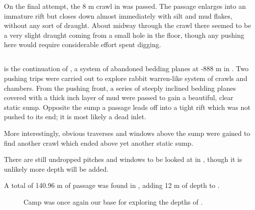 On the final attempt, the 8 m crawl in  was passed.
The passage enlarges into an immature rift but closes down almost
immediately with silt and mud flakes, without any sort of draught. About
midway through the crawl there seemed to be a very slight draught coming
from a small hole in the floor, though any pushing here would require
considerable effort spent digging.


\subsection{}

 is the continuation of , a
system of abandoned bedding planes at -888 m in . Two
pushing trips were carried out to explore rabbit warren-like system of
crawls and chambers. From the  pushing front, a
series of steeply inclined bedding planes covered with a thick inch
layer of mud were passed to gain a beautiful, clear static sump.
Opposite the sump a passage leads off into a tight rift which was not
pushed to its end; it is most likely a dead inlet.

More interestingly, obvious traverses and windows above the sump were
gained to find another crawl which ended above yet another static sump.

There are still undropped pitches and windows to be looked at in
, though it is unlikely more depth will be added.

A total of 140.96 m of passage was found in ,
adding 12 m of depth to .


\begin{figure}[t!]
\checkoddpage \ifoddpage \forcerectofloat \else \forceversofloat \fi
{}
\caption{Camp \protect{} was once again our base for exploring the depths of . } \label{x-ray 2012}
\end{figure}



